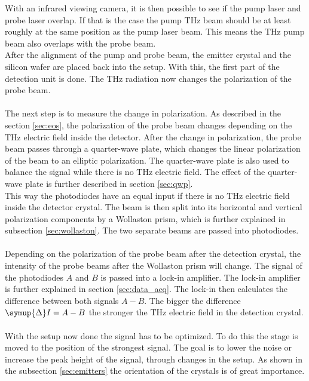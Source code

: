 With an infrared viewing camera, it is then possible to see if the pump laser and probe laser overlap.
If that is the case the pump $\si{\tera\hertz}$ beam should be at least roughly at the same position as the pump laser beam.
This means the $\si{\tera\hertz}$ pump beam also overlaps with the probe beam.
\\
After the alignment of the pump and probe beam, the emitter crystal and the silicon wafer are placed back into the setup.
With this, the first part of the detection unit is done.
The $\si{\tera\hertz}$ radiation now changes the polarization of the probe beam.
\\\\
The next step is to measure the change in polarization.
As described in the section \ref{sec:eos}, the polarization of the probe beam changes depending on the $\si{\tera\hertz}$ electric field inside the detector.
After the change in polarization, the probe beam passes through a quarter-wave plate, which changes the linear polarization of the beam to an elliptic polarization.
The quarter-wave plate is also used to balance the signal while there is no $\si{\tera\hertz}$ electric field.
The effect of the quarter-wave plate is further described in section \ref{sec:qwp}.
\\
This way the photodiodes have an equal input if there is no $\si{\tera\hertz}$ electric field inside the detector crystal.
The beam is then split into its horizontal and vertical polarization components by a Wollaston prism, which is further explained in subsection \ref{sec:wollaston}.
The two separate beams are passed into photodiodes.
\\\\
Depending on the polarization of the probe beam after the detection crystal, the intensity of the probe beams after the Wollaston prism will change.
The signal of the photodiodes $A$ and $B$ is passed into a lock-in amplifier.
The lock-in amplifier is further explained in section \ref{sec:data_acq}.
The lock-in then calculates the difference between both signals $A-B$.
The bigger the difference $\symup{\Delta}I = A-B$ the stronger the $\si{\tera\hertz}$ electric field in the detection crystal.
\\\\
With the setup now done the signal has to be optimized.
To do this the stage is moved to the position of the strongest signal.
The goal is to lower the noise or increase the peak height of the signal, through changes in the setup.
As shown in the subsection \ref{sec:emitters} the orientation of the crystals is of great importance.
